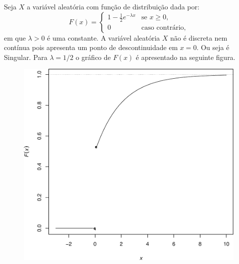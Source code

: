 \begin{frame}
\begin{exem}
	Seja $X$ a variável aleatória com função de distribuição dada por:%
	\begin{equation*}
	F(x)=
	\begin{cases}
	1-\frac{1}{2}e^{-\lambda x}&\text{se }x\geq 0, \\
	0&\text{caso contrário},%
	\end{cases}
	\end{equation*} 
	em que $\lambda >0$ é uma constante.  A variável aleatória $X$ não  é discreta nem contínua pois apresenta um ponto de descontinuidade em $x=0.$ Ou seja é Singular. Para $\lambda=1/2$ o gráfico de $F(x)$ é apresentado na seguinte figura. %
\end{exem}

\begin{figure}[!htb]
	\begin{center}
		\includegraphics[scale=0.26]{fig17.pdf}
		
	\end{center}
\end{figure}

\end{frame}





